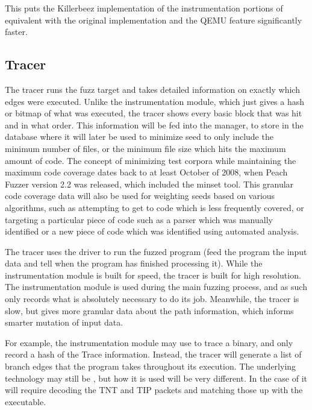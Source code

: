 This puts the Killerbeez implementation of the instrumentation portions of
\AFL{} equivalent with the original implementation and the QEMU feature
significantly faster.

\subsection{Tracer} \label{Tracer}
The tracer runs the fuzz target and takes detailed information on exactly which
edges were executed.  Unlike the instrumentation module, which just gives a
hash or bitmap of what was executed, the tracer shows every basic block that
was hit and in what order.  This information will be fed into the manager,
to store in the database where it will later be used to minimize seed to only
include the minimum number of files, or the minimum file size which hits the
maximum amount of code. The concept of minimizing test corpora while
maintaining the maximum code coverage dates back to at least October of 2008,
when Peach Fuzzer version 2.2 was released, which included the minset
tool.\cite{peach22} This granular code coverage data will also be used for
weighting seeds based on various algorithms, such as attempting to get to code
which is less frequently covered, or targeting a particular piece of code such
as a parser which was manually identified or a new piece of code which was
identified using automated analysis.

The tracer uses the driver to run the fuzzed program (feed the program the
input data and tell when the program has finished processing it). While the
instrumentation module is built for speed, the tracer is built for high
resolution.  The instrumentation module is used during the main fuzzing
process, and as such only records what is absolutely necessary to do its job.
Meanwhile, the tracer is slow, but gives more granular data about the path
information, which informs smarter mutation of input data.

For example, the instrumentation module may use \IPT{} to trace a binary, and
only record a hash of the Trace information.  Instead, the tracer will generate
a list of branch edges that the program takes throughout its execution.  The
underlying technology may still be \IPT{}, but how it is used will be very
different.  In the case of \IPT{} it will require decoding the TNT and TIP
packets and matching those up with the executable.

